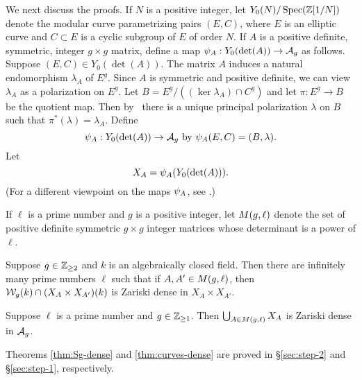 \documentclass{amsart}
\begin{document}
We next discuss the proofs. 
If $N$ is a positive integer, let $Y_0(N)/\operatorname{Spec}(\mathbb{Z}[1/N])$ denote the modular curve parametrizing pairs $(E, C)$, where $E$ is an elliptic curve and $C \subset E$ is a cyclic subgroup of $E$ of order $N$. If $A$ is a positive definite, symmetric, integer $g\times g$ matrix, define a map $\psi_{A}: Y_0(\det(A)) \to \mathcal{A}_g$ as follows. Suppose $(E, C) \in Y_0(\det(A))$. The matrix $A$ induces a natural endomorphism $\lambda_A$ of $E^g$. Since $A$ is symmetric and positive definite, we can view $\lambda_A$ as a polarization on $E^g$. Let $B = E^g/((\ker \lambda_A) \cap C^g)$ and let $\pi: E^g \to B$ be the quotient map. Then by~\cite[Prop. 16.8]{milne-av} there is a unique principal polarization $\lambda$ on $B$ such that $\pi^*(\lambda) = \lambda_A$. Define
\begin{equation}\label{def:psimoddef}
\psi_{A}: Y_0(\det(A)) \to \mathcal{A}_g  \text{ by } \psi_{A}(E,C) = (B,\lambda).
\end{equation}
Let
$$X_A=\psi_{A}(Y_0(\det(A))).$$
(For a different viewpoint on the maps $\psi_{A}$, see \cite[p. 19 et seq.]{rains}.)

\begin{definition}\label{def:detl}
If $\ell$ is a prime number and $g$ is a positive integer, let $M(g,\ell)$ denote the set of positive definite symmetric $g \times g$ integer matrices whose determinant is a power of $\ell$.
\end{definition}

\begin{theorem}\label{thm:Sg-dense}
  Suppose $g\in\mathbb{Z}_{\ge 2}$ and $k$ is an algebraically closed field. 
  Then there are infinitely many prime numbers $\ell$ such that if
  $A,A' \in M(g,\ell)$, then $\mathcal{W}_g(k) \cap (X_A \times X_{A'})(k)$ is Zariski dense in $X_A \times X_{A'}$.
\end{theorem}

\begin{theorem}\label{thm:curves-dense}
    Suppose $\ell$ is a prime number and $g\in\mathbb{Z}_{\ge 1}$. Then $\bigcup_{A \in M(g,\ell)} X_A$ is Zariski dense in $\mathcal{A}_g$.
\end{theorem}

Theorems \ref{thm:Sg-dense} and \ref{thm:curves-dense} are proved in \S\ref{sec:step-2} and \S\ref{sec:step-1}, respectively.
\end{document}
